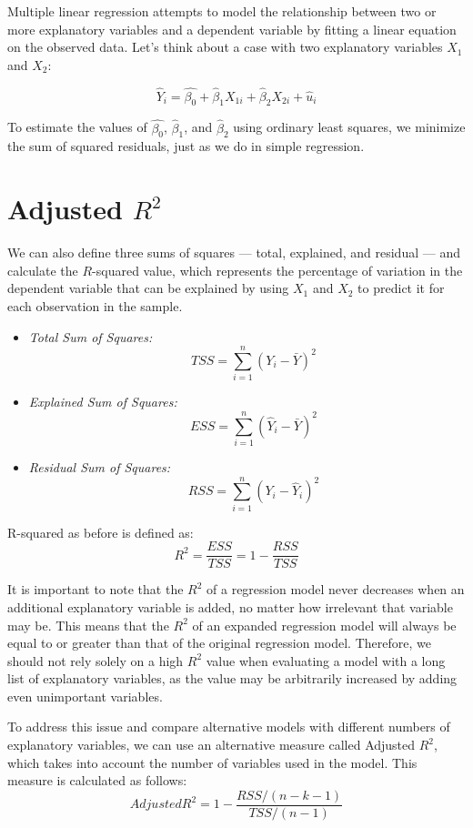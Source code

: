 \documentclass{./../../Latex/handout}
\begin{document}
\thispagestyle{plain}
\newcommand{\mytitle}{Multiple Linear Regression}
\myheader{\mytitle}

Multiple linear regression attempts to model the relationship between two or more explanatory variables and a dependent variable by fitting a linear equation on the observed data. Let's think about a case with two explanatory variables $X_1$ and $X_2$:

$$ \hat{Y}_i = \hat{\beta_0} + \hat{\beta}_1 X_{1i} + \hat{\beta}_2 X_{2i} + \hat{u}_i  $$ 

To estimate the values of $\hat{\beta_0}$, $\hat{\beta}_1$, and $\hat{\beta}_2$ using ordinary least squares, we minimize the sum of squared residuals, just as we do in simple regression. 

\section{Adjusted $R^2$}
We can also define three sums of squares --- total, explained, and residual --- and calculate the $R$-squared value, which represents the percentage of variation in the dependent variable that can be explained by using $X_1$ and $X_2$ to predict it for each observation in the sample.
 \begin{itemize}
\item[]   \textit{Total Sum of Squares:} $$ \quad TSS = \sum_{i=1}^n (Y_i-\bar{Y})^2 $$
\item[]  \textit{Explained Sum of Squares:} $$ \quad ESS = \sum_{i=1}^n (\hat{Y}_i-\bar{Y})^2 $$
\item[]  \textit{Residual Sum of Squares:} $$ \quad RSS = \sum_{i=1}^n (Y_i-\hat{Y}_i)^2 $$
\end{itemize}

R-squared as before is defined as:
$$ R^2 = \frac{ESS}{TSS} = 1-\frac{RSS}{TSS} $$ 

It is important to note that the $R^2$ of a regression model never decreases when an additional explanatory variable is added, no matter how irrelevant that variable may be. This means that the $R^2$ of an expanded regression model will always be equal to or greater than that of the original regression model. Therefore, we should not rely solely on a high $R^2$ value when evaluating a model with a long list of explanatory variables, as the value may be arbitrarily increased by adding even unimportant variables.

To address this issue and compare alternative models with different numbers of explanatory variables, we can use an alternative measure called Adjusted $R^2$, which takes into account the number of variables used in the model. This measure is calculated as follows:
$$ Adjusted R^2 = 1-\frac{RSS/(n-k-1)}{TSS/(n-1)} $$ 
\end{document}
